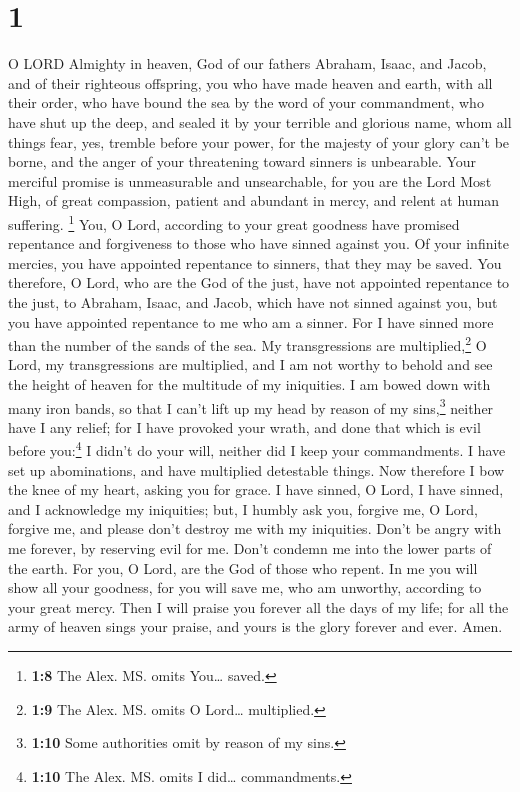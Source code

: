 \hypertarget{section}{%
\section{1}\label{section}}

 O LORD Almighty in heaven, God of our fathers Abraham,
Isaac, and Jacob, and of their righteous offspring,  you
who have made heaven and earth, with all their order,  who
have bound the sea by the word of your commandment, who have shut up the
deep, and sealed it by your terrible and glorious name, 
whom all things fear, yes, tremble before your power,  for
the majesty of your glory can't be borne, and the anger of your
threatening toward sinners is unbearable.  Your merciful
promise is unmeasurable and unsearchable,  for you are the
Lord Most High, of great compassion, patient and abundant in mercy, and
relent at human suffering.  \footnote{\textbf{1:8} The
  Alex. MS. omits You\ldots{} saved.} You, O Lord, according to your
great goodness have promised repentance and forgiveness to those who
have sinned against you. Of your infinite mercies, you have appointed
repentance to sinners, that they may be saved. You therefore, O Lord,
who are the God of the just, have not appointed repentance to the just,
to Abraham, Isaac, and Jacob, which have not sinned against you, but you
have appointed repentance to me who am a sinner.  For I
have sinned more than the number of the sands of the sea. My
transgressions are multiplied,\footnote{\textbf{1:9} The Alex. MS. omits
  O Lord\ldots{} multiplied.} O Lord, my transgressions are multiplied,
and I am not worthy to behold and see the height of heaven for the
multitude of my iniquities.  I am bowed down with many
iron bands, so that I can't lift up my head by reason of my
sins,\footnote{\textbf{1:10} Some authorities omit by reason of my sins.}
neither have I any relief; for I have provoked your wrath, and done that
which is evil before you:\footnote{\textbf{1:10} The Alex. MS. omits I
  did\ldots{} commandments.} I didn't do your will, neither did I keep
your commandments. I have set up abominations, and have multiplied
detestable things.  Now therefore I bow the knee of my
heart, asking you for grace.  I have sinned, O Lord, I
have sinned, and I acknowledge my iniquities;  but, I
humbly ask you, forgive me, O Lord, forgive me, and please don't destroy
me with my iniquities. Don't be angry with me forever, by reserving evil
for me. Don't condemn me into the lower parts of the earth. For you, O
Lord, are the God of those who repent.  In me you will
show all your goodness, for you will save me, who am unworthy, according
to your great mercy.  Then I will praise you forever all
the days of my life; for all the army of heaven sings your praise, and
yours is the glory forever and ever. Amen.
